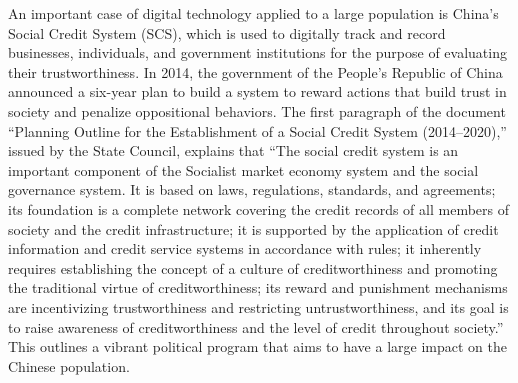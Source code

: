 An important case of digital technology applied to a large population is China's Social Credit System (SCS), which is used to digitally track and record businesses, individuals, and government institutions for the purpose of evaluating their trustworthiness. In 2014, the government of the People's Republic of China announced a six-year plan to build a system to reward actions that build trust in society and penalize oppositional behaviors. The first paragraph of the document ``Planning Outline for the Establishment of a Social Credit System (2014--2020),'' issued by the State Council, explains that ``The social credit system is an important component of the Socialist market economy system and the social governance system. It is based on laws, regulations, standards, and agreements; its foundation is a complete network covering the credit records of all members of society and the credit infrastructure; it is supported by the application of credit information and credit service systems in accordance with rules; it inherently requires establishing the concept of a culture of creditworthiness and promoting the traditional virtue of creditworthiness; its reward and punishment mechanisms are incentivizing trustworthiness and restricting untrustworthiness, and its goal is to raise awareness of creditworthiness and the level of credit throughout society.'' This outlines a vibrant political program that aims to have a large impact on the Chinese population.

